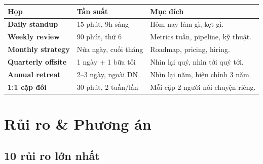 \documentclass[11pt,a4paper]{article}
\begin{document}
\begin{tabularx}{\linewidth}{@{}p{3cm} p{2.5cm} X@{}}
\toprule
\textbf{Họp} & \textbf{Tần suất} & \textbf{Mục đích} \\
\midrule
\textbf{Daily standup} & 15 phút, 9h sáng & Hôm nay làm gì, kẹt gì. \\
\textbf{Weekly review} & 90 phút, thứ 6 & Metrics tuần, pipeline, kỹ thuật. \\
\textbf{Monthly strategy} & Nửa ngày, cuối tháng & Roadmap, pricing, hiring. \\
\textbf{Quarterly offsite} & 1 ngày + 1 bữa tối & Nhìn lại quý, nhìn tới quý tới. \\
\textbf{Annual retreat} & 2--3 ngày, ngoài DN & Nhìn lại năm, hiệu chỉnh 3 năm. \\
\textbf{1:1 cặp đôi} & 30 phút, 2 tuần/lần & Mỗi cặp 2 người nói chuyện riêng. \\
\bottomrule
\end{tabularx}

\clearpage

\section{Rủi ro \& Phương án}

\subsection{10 rủi ro lớn nhất}
\end{document}
